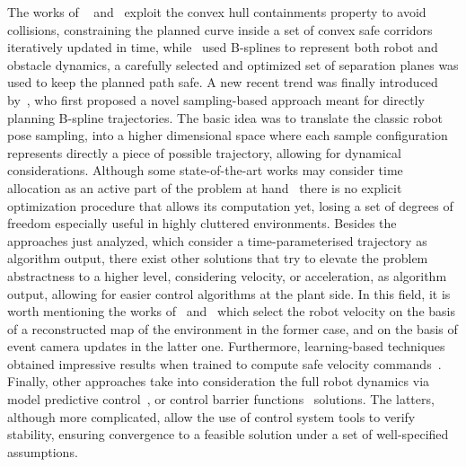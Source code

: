 The works of ~\cite{park2022online} and~\cite{park2020efficient} exploit the convex hull containments property to avoid collisions, constraining the planned curve inside a set
of convex safe corridors iteratively updated in time, while~\cite{tordesillas2021mader} used B-splines to represent both robot and
obstacle dynamics, a carefully selected and optimized set of separation planes was used to keep the planned path safe.
A new recent trend was finally introduced by~\cite{ding2019efficient}, who first proposed a novel sampling-based approach meant for
directly planning B-spline trajectories. The basic idea was to translate the classic robot pose sampling, into a higher dimensional space
where each sample configuration represents directly a piece of possible trajectory, allowing for dynamical considerations.
Although some state-of-the-art works may consider time allocation as an active part of the problem at hand~\cite{ding2019efficient, park2020efficient, tordesillas2021mader}
there is no explicit optimization procedure that allows its computation yet, losing a set of degrees of freedom especially useful in highly cluttered environments.
Besides the approaches just analyzed, which consider a time-parameterised trajectory as algorithm output, there exist other solutions
that try to elevate the problem abstractness to a higher level, considering velocity, or acceleration, as algorithm output, allowing for
easier control algorithms at the plant side.
In this field, it is worth mentioning the works of~\cite{cieslewski2017rapid} and~\cite{falanga2020dynamic} which select the robot velocity
on the basis of a reconstructed map of the environment in the former case, and on the basis of event camera updates in the latter one.
Furthermore, learning-based techniques obtained impressive results when trained to compute safe velocity commands~\cite{loquercio2018dronet, loquercio2021learning}.
Finally, other approaches take into consideration the full robot dynamics via model predictive control~\cite{penin2018vision}, or
control barrier functions~\cite{wang2017safety, singletary2021comparative, khan2022gaussian} solutions.
The latters, although more complicated, allow the use of control system tools to verify stability, ensuring convergence to a feasible solution
under a set of well-specified assumptions.

